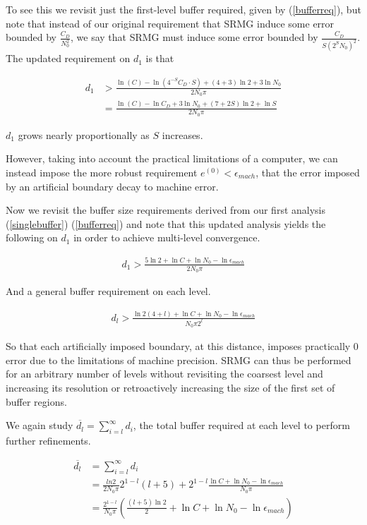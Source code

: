 \documentclass[final]{siamart1116}
\numberwithin{theorem}{section}
\begin{document}
To see this we revisit just the first-level buffer required, given by (\ref{bufferreq}), but note that instead of our original requirement that SRMG induce some error bounded by $\frac{C_D}{N_0^2}$, we say that SRMG must induce some error bounded by $\frac{C_D}{S (2^S N_0)^2}$. The updated requirement on $d_1$ is that 

\begin{align*}
d_1 &> \frac{\ln(C) - \ln{(4^{-S} C_D \cdot S) } +(4+3)\ln2 + 3\ln{N_0} }{2 N_0 \pi}\\
  & = \frac{\ln(C)- \ln{C_D } + 3\ln{N_0}+ (7+2S)\ln2 + \ln{S} }{2 N_0 \pi} 
\end{align*}

$d_1$ grows nearly proportionally as $S$ increases. 

However, taking into account the practical limitations of a computer, we can instead impose the more robust requirement $e^{(0)} < \epsilon_{mach}$, that the error imposed by an artificial boundary decay to machine error. 

Now we revisit the buffer size requirements derived from our first analysis (\ref{singlebuffer}) (\ref{bufferreq}) and note that this updated analysis yields the following  on $d_1$ in order to achieve multi-level convergence.

\begin{align*}
d_1 > \frac{ 5\ln{2} + \ln{C} + \ln{N_0} - \ln{ \epsilon_{mach} }  }{2 N_0 \pi }
\end{align*}

And a general buffer requirement on each level. 

\begin{align*}
d_l > \frac{\ln{2}(4+l) + \ln{C} + \ln{N_0} -\ln{\epsilon_{mach}} }{N_0 \pi 2^l} 
\end{align*}

So that each artificially imposed boundary, at this distance, imposes practically 0 error due to the limitations of machine precision. SRMG can thus be performed for an arbitrary number of levels without revisiting the coarsest level and increasing its resolution or retroactively increasing the size of the first set of buffer regions. 

We again study $\overline{d_l} = \sum_{i=l}^\infty d_i$, the total buffer required at each level to perform further refinements.


\begin{align*}
\overline{d_l} &= \sum_{i=l}^\infty d_i \\ 
& = \frac{ln2}{2 N_0 \pi } 2^{1-l}(l+5) + 2^{1-l}\frac{\ln{C} + \ln{N_0} -\ln{\epsilon_{mach}} }{ N_0 \pi}\\
& = \frac{2^{1-l}}{N_0 \pi } \left( \frac{(l+5)\ln2 }{2} + \ln C + \ln{N_0} - \ln{\epsilon_{mach}} \right)
\end{align*}
\end{document}
